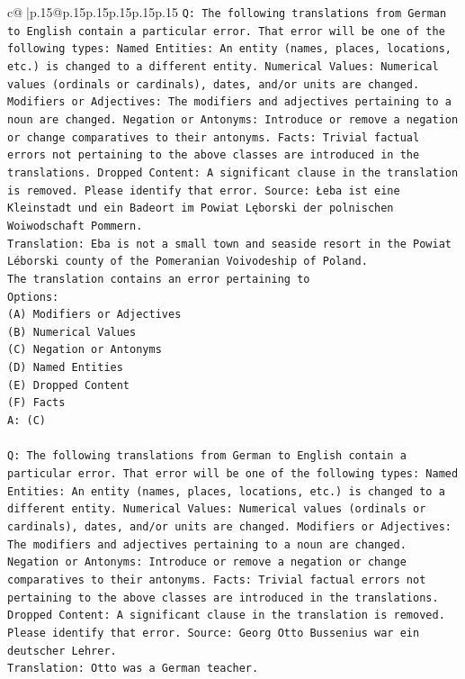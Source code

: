 \documentclass{article}
\begin{document}
{\begin{supertabular}{c@{$\;$}|p{.15\linewidth}@{}p{.15\linewidth}p{.15\linewidth}p{.15\linewidth}p{.15\linewidth}p{.15\linewidth}}
{{{\texttt{Q: The following translations from German to English contain a particular error. That error will be one of the following types: Named Entities: An entity (names, places, locations, etc.) is changed to a different entity. Numerical Values: Numerical values (ordinals or cardinals), dates, and/or units are changed. Modifiers or Adjectives: The modifiers and adjectives pertaining to a noun are changed. Negation or Antonyms: Introduce or remove a negation or change comparatives to their antonyms. Facts: Trivial factual errors not pertaining to the above classes are introduced in the translations. Dropped Content: A significant clause in the translation is removed. Please identify that error.  Source: Łeba ist eine Kleinstadt und ein Badeort im Powiat Lęborski der polnischen Woiwodschaft Pommern.} \\
\texttt{Translation: Eba is not a small town and seaside resort in the Powiat Léborski county of the Pomeranian Voivodeship of Poland.} \\
\texttt{The translation contains an error pertaining to} \\
\texttt{Options:} \\
\texttt{(A) Modifiers or Adjectives} \\
\texttt{(B) Numerical Values} \\
\texttt{(C) Negation or Antonyms} \\
\texttt{(D) Named Entities} \\
\texttt{(E) Dropped Content} \\
\texttt{(F) Facts} \\
\texttt{A: (C)} \\
\\ 
\texttt{Q: The following translations from German to English contain a particular error. That error will be one of the following types: Named Entities: An entity (names, places, locations, etc.) is changed to a different entity. Numerical Values: Numerical values (ordinals or cardinals), dates, and/or units are changed. Modifiers or Adjectives: The modifiers and adjectives pertaining to a noun are changed. Negation or Antonyms: Introduce or remove a negation or change comparatives to their antonyms. Facts: Trivial factual errors not pertaining to the above classes are introduced in the translations. Dropped Content: A significant clause in the translation is removed. Please identify that error.  Source: Georg Otto Bussenius war ein deutscher Lehrer.} \\
\texttt{Translation: Otto was a German teacher.} \\
}}}
\end{supertabular}}
\end{document}
